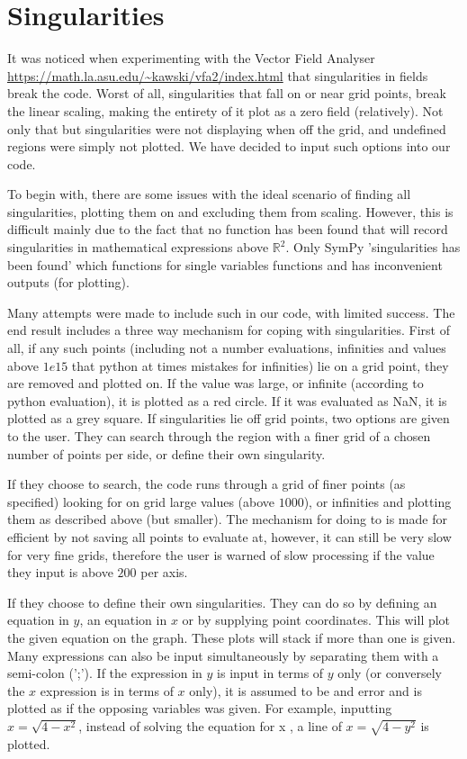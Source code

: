 \documentclass[12pt]{report}
\begin{document}
\chapter{Singularities}
It was noticed when experimenting with the Vector Field Analyser \url{https://math.la.asu.edu/~kawski/vfa2/index.html} that singularities in fields break the code. Worst of all, singularities that fall on or near grid points, break the linear scaling, making the entirety of it plot as a zero field (relatively). Not only that but singularities were not displaying when off the grid, and undefined regions were simply not plotted. We have decided to input such options into our code.

To begin with, there are some issues with the ideal scenario of finding all singularities, plotting them on and excluding them from scaling. However, this is difficult mainly due to the fact that no function has been found that will record singularities in mathematical expressions above $\mathbb{R}^{2}$. Only SymPy 'singularities has been found' which functions for single variables functions and has inconvenient outputs (for plotting).

Many attempts were made to include such in our code, with limited success.
The end result includes a three way mechanism for coping with singularities.
First of all, if any such points (including not a number evaluations, infinities and values above $1e15$ that python at times mistakes for infinities) lie on a grid point, they are removed and plotted on. If the value was large, or infinite (according to python evaluation), it is plotted as a red circle. If it was evaluated as NaN, it is plotted as a grey square.
If singularities lie off grid points, two options are given to the user. They can search through the region with a finer grid of a chosen number of points per side, or define their own singularity.

If they choose to search, the code runs through a grid of finer points (as specified) looking for on grid large values (above $1000$), or infinities and plotting them as described above (but smaller). The mechanism for doing to is made for efficient by not saving all points to evaluate at, however, it can still be very slow for very fine grids, therefore the user is warned of slow processing if the value they input is above $200$ per axis.

If they choose to define their own singularities. They can do so by defining an equation in $y$, an equation in $x$ or by supplying point coordinates. This will plot the given equation on the graph. These plots will stack if more than one is given. Many expressions can also be input simultaneously by separating them with a semi-colon (';'). If the expression in $y$ is input in terms of $y$ only (or conversely the $x$ expression is in terms of $x$ only), it is assumed to be and error and is plotted as if the opposing variables was given. For example, inputting $x = \sqrt{4 - x^2}$, instead of solving the equation for x , a line of $x = \sqrt{4 - y^2}$ is plotted.
\end{document}
